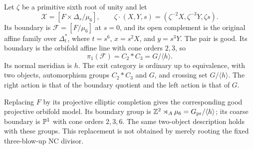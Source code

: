 \begin{proposition}
\label{P1e-cusp-stack}
Let $\zeta$ be a primitive sixth root of unity and let
\[
 \mathcal X=[F\times\Delta_s/\mu _6],\qquad
 \zeta\cdot(X,Y,s)=(\zeta^{-2}X,\zeta^{-3}Y,\zeta s).
\]
Its boundary is $\mathcal F=[F/\mu _6]$ at $s=0$, and its open
complement is the original affine family over $\Delta_t^*$,
where $t=s^6$, $x=s^2X$, and $y=s^3Y$.
The pair is good. Its boundary is the orbifold affine line with
cone orders $2,3$, so
\[
 \pi _1(\mathcal F)=C_2*C_3=G/\langle h\rangle .
\]
Its normal meridian is $h$. The exit category is ordinary up to
equivalence, with two objects, automorphism groups
$C_2*C_3$ and $G$, and crossing set $G/\langle h\rangle$.
The right action is that of the boundary quotient and the left
action is that of $G$.

Replacing $F$ by its projective elliptic completion gives the
corresponding good projective orbifold model. Its boundary group
is $\mathbb Z^2\rtimes_A\mu _6=G_{\rm pr}/\langle h\rangle$; its coarse
boundary is $\mathbb P^1$ with cone orders $2,3,6$. The same two-object
description holds with these groups. This replacement is not
obtained by merely rooting the fixed three-blow-up NC divisor.
\end{proposition}
